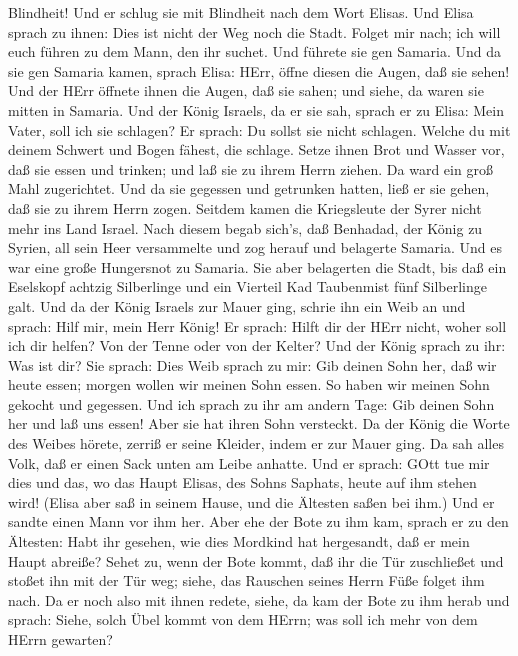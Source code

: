 Blindheit! Und er schlug sie mit Blindheit nach dem Wort Elisas.
 Und Elisa sprach zu ihnen: Dies ist nicht der Weg noch die
Stadt. Folget mir nach; ich will euch führen zu dem Mann, den ihr
suchet. Und führete sie gen Samaria.  Und da sie gen
Samaria kamen, sprach Elisa: HErr, öffne diesen die Augen, daß sie
sehen! Und der HErr öffnete ihnen die Augen, daß sie sahen; und siehe,
da waren sie mitten in Samaria.  Und der König Israels, da
er sie sah, sprach er zu Elisa: Mein Vater, soll ich sie schlagen?
 Er sprach: Du sollst sie nicht schlagen. Welche du mit
deinem Schwert und Bogen fähest, die schlage. Setze ihnen Brot und
Wasser vor, daß sie essen und trinken; und laß sie zu ihrem Herrn
ziehen.  Da ward ein groß Mahl zugerichtet. Und da sie
gegessen und getrunken hatten, ließ er sie gehen, daß sie zu ihrem Herrn
zogen. Seitdem kamen die Kriegsleute der Syrer nicht mehr ins Land
Israel.  Nach diesem begab sich's, daß Benhadad, der König
zu Syrien, all sein Heer versammelte und zog herauf und belagerte
Samaria.  Und es war eine große Hungersnot zu Samaria. Sie
aber belagerten die Stadt, bis daß ein Eselskopf achtzig Silberlinge und
ein Vierteil Kad Taubenmist fünf Silberlinge galt.  Und da
der König Israels zur Mauer ging, schrie ihn ein Weib an und sprach:
Hilf mir, mein Herr König!  Er sprach: Hilft dir der HErr
nicht, woher soll ich dir helfen? Von der Tenne oder von der Kelter?
 Und der König sprach zu ihr: Was ist dir? Sie sprach: Dies
Weib sprach zu mir: Gib deinen Sohn her, daß wir heute essen; morgen
wollen wir meinen Sohn essen.  So haben wir meinen Sohn
gekocht und gegessen. Und ich sprach zu ihr am andern Tage: Gib deinen
Sohn her und laß uns essen! Aber sie hat ihren Sohn versteckt.
 Da der König die Worte des Weibes hörete, zerriß er seine
Kleider, indem er zur Mauer ging. Da sah alles Volk, daß er einen Sack
unten am Leibe anhatte.  Und er sprach: GOtt tue mir dies
und das, wo das Haupt Elisas, des Sohns Saphats, heute auf ihm stehen
wird!  (Elisa aber saß in seinem Hause, und die Ältesten
saßen bei ihm.) Und er sandte einen Mann vor ihm her. Aber ehe der Bote
zu ihm kam, sprach er zu den Ältesten: Habt ihr gesehen, wie dies
Mordkind hat hergesandt, daß er mein Haupt abreiße? Sehet zu, wenn der
Bote kommt, daß ihr die Tür zuschließet und stoßet ihn mit der Tür weg;
siehe, das Rauschen seines Herrn Füße folget ihm nach.  Da
er noch also mit ihnen redete, siehe, da kam der Bote zu ihm herab und
sprach: Siehe, solch Übel kommt von dem HErrn; was soll ich mehr von dem
HErrn gewarten?


